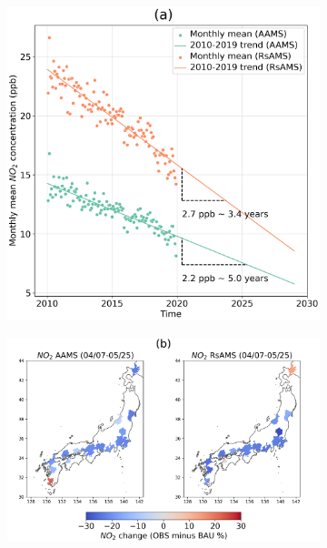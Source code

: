 \begin{figure}[tbh!]
    \centering
    \begin{subfigure}{.5\textwidth}
      \centering
      \includegraphics[width=\textwidth]{figs/chap4/fig4a.png}
    \end{subfigure}%
    \begin{subfigure}{.5\textwidth}
      \centering
      \includegraphics[width=\textwidth]{figs/chap4/fig4b.png}
    \end{subfigure}


\end{figure}
